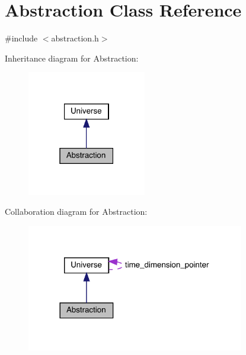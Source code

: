 \hypertarget{class_abstraction}{}\section{Abstraction Class Reference}
\label{class_abstraction}


{\ttfamily \#include $<$abstraction.\+h$>$}



Inheritance diagram for Abstraction\+:\nopagebreak
\begin{figure}[H]
\begin{center}
\leavevmode
\includegraphics[width=147pt]{class_abstraction__inherit__graph}
\end{center}
\end{figure}


Collaboration diagram for Abstraction\+:\nopagebreak
\begin{figure}[H]
\begin{center}
\leavevmode
\includegraphics[width=269pt]{class_abstraction__coll__graph}
\end{center}
\end{figure}
